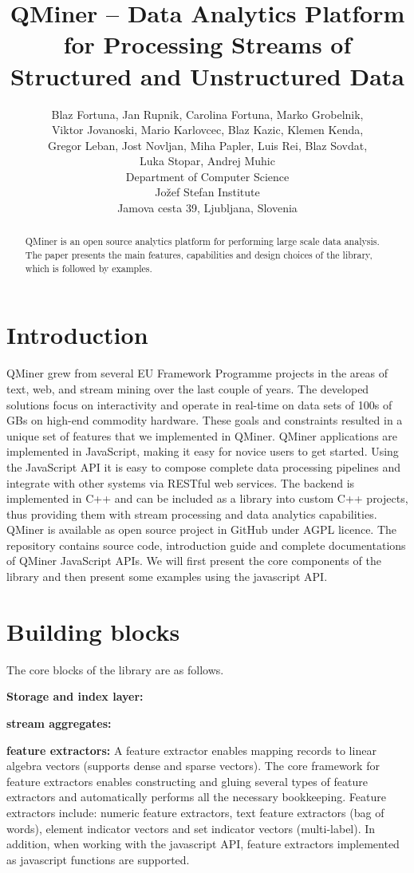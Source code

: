 \documentclass{article} %
\title{QMiner – Data Analytics Platform for Processing Streams of Structured and Unstructured Data}
\author{
Blaz Fortuna, Jan Rupnik, Carolina Fortuna, Marko Grobelnik, \\
Viktor Jovanoski, Mario Karlovcec, Blaz Kazic, Klemen Kenda, \\
Gregor Leban, Jost Novljan, Miha Papler, Luis Rei, Blaz Sovdat, \\
Luka Stopar, Andrej Muhic \\
Department of Computer Science\\
Jožef Stefan Institute\\
Jamova cesta 39, Ljubljana, Slovenia \\
}
\begin{document}
\maketitle

\begin{abstract}
QMiner is an open source analytics platform for performing large scale data analysis.
The paper presents the main features, capabilities and design choices of the library, which
is followed by examples.
\end{abstract}

\section{Introduction}
QMiner grew from several EU Framework Programme projects in the areas of text, web, and stream mining over the last couple of years. The developed solutions focus on interactivity and operate in real-time on data sets of 100s of GBs on high-end commodity hardware. These goals and constraints resulted in a unique set of features that we implemented in QMiner.
QMiner applications are implemented in JavaScript, making it easy for novice users to get started. Using the JavaScript API it is easy to compose complete data processing pipelines and integrate with other systems via RESTful web services. The backend is implemented in C++ and can be included as a library into custom C++ projects, thus providing them with stream processing and data analytics capabilities.
QMiner is available as open source project in GitHub under AGPL licence. The repository contains source code, introduction guide and complete documentations of QMiner JavaScript APIs.
We will first present the core components of the library and then present some examples using the javascript API.

\section{Building blocks}
The core blocks of the library are as follows.

\textbf{Storage and index layer:}

\textbf{stream aggregates:}

\textbf{feature extractors:} A feature extractor enables mapping records to linear algebra vectors (supports dense and sparse vectors). 
The core framework for feature extractors enables constructing and gluing several types of feature extractors and automatically performs all the necessary bookkeeping. 
Feature extractors include: numeric feature extractors, text feature extractors (bag of words), element indicator vectors and set indicator vectors (multi-label). In addition, when working with the javascript API, feature extractors implemented as javascript functions are supported.
\end{document}
